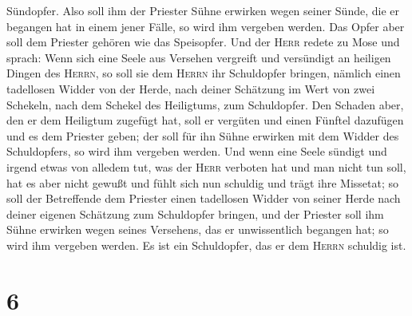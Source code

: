 Sündopfer.  Also soll ihm der Priester Sühne erwirken
wegen seiner Sünde, die er begangen hat in einem jener Fälle, so wird
ihm vergeben werden. Das Opfer aber soll dem Priester gehören wie das
Speisopfer.  Und der \textsc{Herr} redete zu Mose und
sprach:  Wenn sich eine Seele aus Versehen vergreift und
versündigt an heiligen Dingen des \textsc{Herrn}, so soll sie dem
\textsc{Herrn} ihr Schuldopfer bringen, nämlich einen tadellosen Widder
von der Herde, nach deiner Schätzung im Wert von zwei Schekeln, nach dem
Schekel des Heiligtums, zum Schuldopfer.  Den Schaden
aber, den er dem Heiligtum zugefügt hat, soll er vergüten und einen
Fünftel dazufügen und es dem Priester geben; der soll für ihn Sühne
erwirken mit dem Widder des Schuldopfers, so wird ihm vergeben werden.
 Und wenn eine Seele sündigt und irgend etwas von alledem
tut, was der \textsc{Herr} verboten hat und man nicht tun soll, hat es
aber nicht gewußt und fühlt sich nun schuldig und trägt ihre Missetat;
 so soll der Betreffende dem Priester einen tadellosen
Widder von seiner Herde nach deiner eigenen Schätzung zum Schuldopfer
bringen, und der Priester soll ihm Sühne erwirken wegen seines
Versehens, das er unwissentlich begangen hat; so wird ihm vergeben
werden.  Es ist ein Schuldopfer, das er dem
\textsc{Herrn} schuldig ist.

\hypertarget{section-5}{%
\section{6}\label{section-5}}

